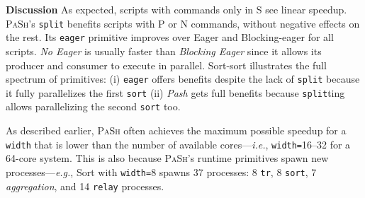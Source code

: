 \documentclass[sigplan, review, screen, anonymous]{acmart}
\newcommand{\eg}{{\em e.g.}, }
\newcommand{\ie}{{\em i.e.}, }
\newcommand{\heading}[1]{\vspace{4pt}\noindent\textbf{#1}\enspace}
\newcommand{\ttt}[1]{\texttt{#1}}
\newcommand{\cn}[1]{\mbox{\textcircled{\footnotesize #1}}}
\newcommand{\tcn}[1]{\mbox{\textcircled{\scriptsize #1}}}
\newcommand{\sta}{\cn{\textsc{S}}\xspace}
\newcommand{\tpur}{\tcn{\textsc{P}}\xspace}
\newcommand{\tnpu}{\tcn{\textsc{N}}\xspace}
\newcommand{\todo}[1]{\hl{#1}\xspace}
\newcommand{\kk}[1]{[{\color{magenta}kk: #1}]}
\newcommand{\sys}{{\scshape PaSh}\xspace}
\begin{document}
\heading{Discussion}
As expected, scripts with commands only in \sta see linear speedup.
\sys's \ttt{split} benefits scripts with \tpur or \tnpu commands, without negative effects on the rest.
Its \ttt{eager} primitive improves over Eager and Blocking-eager for all scripts.
\emph{No Eager} is usually faster than \emph{Blocking Eager} 
since it allows its producer and consumer to execute in parallel.
Sort-sort illustrates the full spectrum of primitives:
  (i) \ttt{eager} offers benefits despite the lack of \ttt{split} because it fully parallelizes the first \ttt{sort} 
  (ii) \emph{Pash} gets full benefits because \ttt{split}ting allows parallelizing the second \ttt{sort} too.


As described earlier, \sys often achieves the maximum possible speedup %
  for a \ttt{width} that is lower than the number of available cores---\ie \ttt{width=}16--32 for a 64-core system.
This is also because \sys's runtime primitives spawn new processes---\eg Sort with \ttt{width=}8 spawns 37 processes:
  8 \ttt{tr}, 8 \ttt{sort}, 7 \emph{aggregation}, and 14 \ttt{relay} processes.

\end{document}
